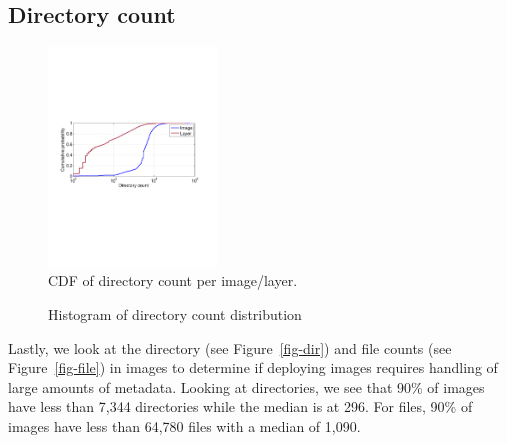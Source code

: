 \subsection{Directory count}
\begin{figure}
	\centering
	\includegraphics[width=0.4\textwidth]{graphs/dir-cnt-cdf.pdf}
	\caption{CDF of directory count per image/layer.
	}
	\label{fig:reference-cnt}
\end{figure}

\begin{figure}[!t]
	\centering
	\caption{Histogram of directory count distribution}
	\label{fig:reference-cnt}
\end{figure}

Lastly, we look at the directory (see Figure~\ref{fig-dir}) and file counts
(see Figure~\ref{fig-file}) in images to determine if deploying
images requires handling of large amounts of metadata. Looking at directories,
we see that 90\% of images have less than 7,344 directories while the median
is at 296. For files, 90\% of images have less than 64,780 files with a median
of 1,090.

